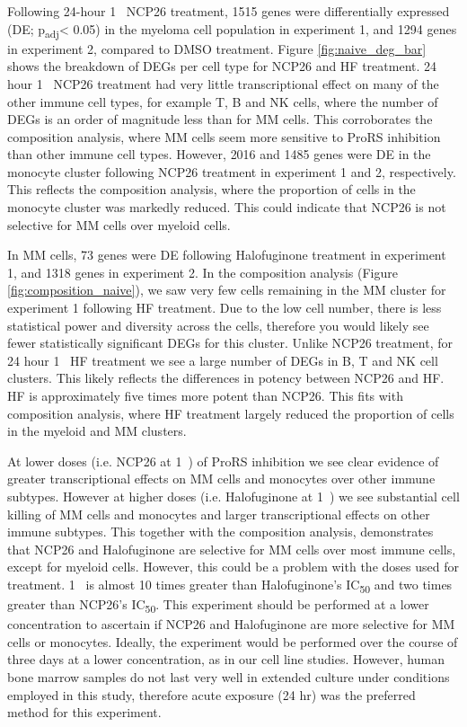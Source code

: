 Following 24-hour 1\si{\micro\Molar} NCP26 treatment, 1515 genes were differentially expressed (DE; p\textsubscript{adj}< 0.05) in the myeloma cell population in experiment 1, and 1294 genes in experiment 2, compared to DMSO treatment.
Figure \ref{fig:naive_deg_bar} shows the breakdown of DEGs per cell type for NCP26 and HF treatment.
24 hour 1\si{\micro\Molar} NCP26 treatment had very little transcriptional effect on many of the other immune cell types, for example T, B and NK cells, where the number of DEGs is an order of magnitude less than for MM cells.
This corroborates the composition analysis, where MM cells seem more sensitive to ProRS inhibition than other immune cell types.
However, 2016 and 1485 genes were DE in the monocyte cluster following NCP26 treatment in experiment 1 and 2, respectively.
This reflects the composition analysis, where the proportion of cells in the monocyte cluster was markedly reduced.
This could indicate that NCP26 is not selective for MM cells over myeloid cells.

In MM cells, 73 genes were DE following Halofuginone treatment in experiment 1, and 1318 genes in experiment 2.
In the composition analysis (Figure \ref{fig:composition_naive}), we saw very few cells remaining in the MM cluster for experiment 1 following HF treatment.
Due to the low cell number, there is less statistical power and diversity across the cells, therefore you would likely see fewer statistically significant DEGs for this cluster.
Unlike NCP26 treatment, for 24 hour 1\si{\micro\Molar} HF treatment we see a large number of DEGs in B, T and NK cell clusters.
This likely reflects the differences in potency between NCP26 and HF\@.
HF is approximately five times more potent than NCP26.
This fits with composition analysis, where HF treatment largely reduced the proportion of cells in the myeloid and MM clusters.

At lower doses (i.e. NCP26 at 1\si{\micro\Molar}) of ProRS inhibition we see clear evidence of greater transcriptional effects on MM cells and monocytes over other immune subtypes.
However at higher doses (i.e. Halofuginone at 1\si{\micro\Molar}) we see substantial cell killing of MM cells and monocytes and larger transcriptional effects on other immune subtypes.
This together with the composition analysis, demonstrates that NCP26 and Halofuginone are selective for MM cells over most immune cells, except for myeloid cells.
However, this could be a problem with the doses used for treatment.
1\si{\micro\Molar} is almost 10 times greater than Halofuginone's IC\textsubscript{50} and two times greater than NCP26's IC\textsubscript{50}.
This experiment should be performed at a lower concentration to ascertain if NCP26 and Halofuginone are more selective for MM cells or monocytes.
Ideally, the experiment would be performed over the course of three days at a lower concentration, as in our cell line studies.
However, human bone marrow samples do not last very well in extended culture under conditions employed in this study, therefore acute exposure (24 hr) was the preferred method for this experiment.

